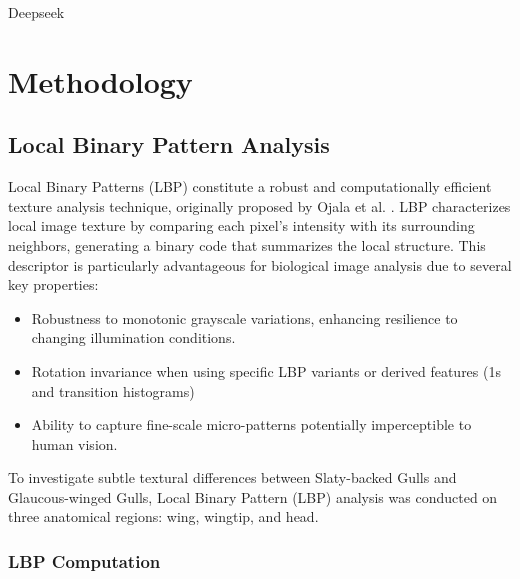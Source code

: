 \documentclass[a4paper,12pt]{report}
\begin{document}
    

Deepseek

\section{Methodology}
\label{sec:methodology}

\subsection{Local Binary Pattern Analysis}

Local Binary Patterns (LBP) constitute a robust and computationally efficient texture analysis technique, originally proposed by Ojala et al. . LBP characterizes local image texture by comparing each pixel's intensity with its surrounding neighbors, generating a binary code that summarizes the local structure. This descriptor is particularly advantageous for biological image analysis due to several key properties:

\begin{itemize}
    \item Robustness to monotonic grayscale variations, enhancing resilience to changing illumination conditions.
    \item Rotation invariance when using specific LBP variants or derived features (1s and transition histograms)
    \item Ability to capture fine-scale micro-patterns potentially imperceptible to human vision.
\end{itemize}

To investigate subtle textural differences between Slaty-backed Gulls and Glaucous-winged Gulls, Local Binary Pattern (LBP) analysis was conducted on three anatomical regions: wing, wingtip, and head.

\subsubsection{LBP Computation}
\end{document}
